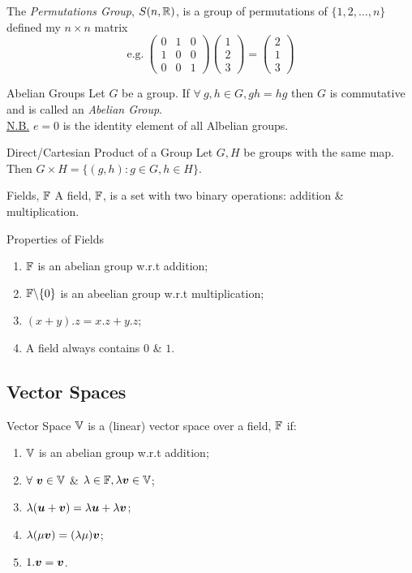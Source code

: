 \documentclass[11pt,a4paper]{article}
\begin{document}
The \textit{Permutations Group}, $S(n, \mathbb{R})$, is a group of permutations of $\{1, 2, \dots, n\}$ defined my $n \times n$ matrix
$$\mathrm{e.g.\ }\begin{pmatrix} 0 & 1 & 0 \\ 1 & 0 & 0 \\ 0 & 0 & 1 \end{pmatrix} \begin{pmatrix}1 \\ 2 \\3 \end{pmatrix} = \begin{pmatrix}2 \\ 1 \\ 3 \end{pmatrix}$$

\subtitle{Theorem 7.3 - }{Abelian Groups}
Let $G$ be a group. If $\forall\ g, h \in G, gh = hg$ then $G$ is commutative and is called an \textit{Abelian Group}.\\
\underline{N.B.} $e = 0$ is the identity element of all Albelian groups.\\

\subtitle{Definition 7.4 - }{Direct/Cartesian Product of a Group}
Let $G, H$ be groups with the same map. Then $G \times H = \{(g, h) : g \in G, h \in H\}$.\\

\subtitle{Definition 7.5 - }{Fields, $\mathbb{F}$}
A field, $\mathbb{F}$, is a set with two binary operations: addition \& multiplication.\\

\subtitle{Theorem 7.6 - }{Properties of Fields}
\begin{enumerate}[label=\roman*)]
  \item $\mathbb{F}$ is an abelian group w.r.t addition;
  \item $\mathbb{F} \backslash \{0\}$  is an abeelian group w.r.t multiplication;
  \item $(x + y) . z = x.z + y.z$;
  \item A field always contains $0$ \& $1$.
\end{enumerate}

\subsection{Vector Spaces}

\subtitle{Definition 7.7 - }{Vector Space}
$\mathbb{V}$ is a (linear) vector space over a field, $\mathbb{F}$ if:
\begin{enumerate}[label=\roman*)]
  \item $\mathbb{V}$ is an abelian group w.r.t addition;
  \item $\forall\ \boldsymbol{v} \in \mathbb{V}$ \& $\lambda \in \mathbb{F}, \lambda\boldsymbol{v} \in \mathbb{V}$;
  \item $\lambda(\boldsymbol{u} + \boldsymbol{v}) = \lambda\boldsymbol{u} + \lambda\boldsymbol{v}$;
  \item $\lambda(\mu\boldsymbol{v}) = (\lambda\mu)\boldsymbol{v}$;
  \item $1.\boldsymbol{v} = \boldsymbol{v}$.
\end{enumerate}
\end{document}
